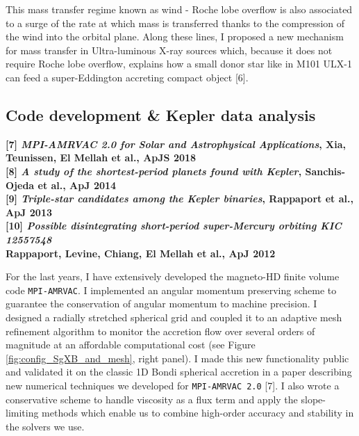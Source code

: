 \documentclass[letterpaper,12pt,onecolumn]{article}
\begin{document}
This mass transfer regime known as wind - Roche lobe overflow is also associated to a surge of the rate at which mass is transferred thanks to the compression of the wind into the orbital plane. Along these lines, I proposed a new mechanism for mass transfer in Ultra-luminous X-ray sources which, because it does not require Roche lobe overflow, explains how a small donor star like in M101 ULX-1 can feed a super-Eddington accreting compact object [6]. 

\subsection*{Code development \& Kepler data analysis}

\footnotesize
\textbf{[7] \textit{MPI-AMRVAC 2.0 for Solar and Astrophysical Applications}, Xia, Teunissen, El Mellah et al., ApJS 2018}\\
\textbf{[8] \textit{A study of the shortest-period planets found with Kepler}, Sanchis-Ojeda et al., ApJ 2014}\\
\textbf{[9] \textit{Triple-star candidates among the Kepler binaries}, Rappaport et al., ApJ 2013}\\
\textbf{[10] \textit{Possible disintegrating short-period super-Mercury orbiting KIC 12557548}}\\
\hspace*{20pt}\textbf{Rappaport, Levine, Chiang, El Mellah et al., ApJ 2012}\\

\normalsize

For the last years, I have extensively developed the magneto-HD finite volume code \texttt{MPI-AMRVAC}. I implemented an angular momentum preserving scheme to guarantee the conservation of angular momentum to machine precision. I designed a radially stretched spherical grid and coupled it to an adaptive mesh refinement algorithm to monitor the accretion flow over several orders of magnitude at an affordable computational cost (see Figure\,\ref{fig:config_SgXB_and_mesh}, right panel). I made this new functionality public and validated it on the classic 1D Bondi spherical accretion in a paper describing new numerical techniques we developed for \texttt{MPI-AMRVAC 2.0} [7]. I also wrote a conservative scheme to handle viscosity as a flux term and apply the slope-limiting methods which enable us to combine high-order accuracy and stability in the solvers we use.
\end{document}
